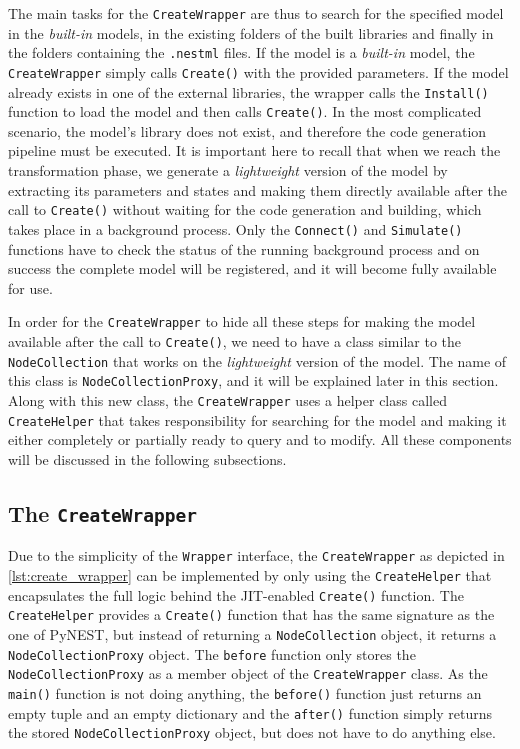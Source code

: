 The main tasks for the \texttt{CreateWrapper} are thus to search for the specified model in the \emph{built-in} models, in the existing folders of the built libraries and finally in the folders containing the \texttt{.nestml} files. If the model is a \emph{built-in} model, the \texttt{CreateWrapper} simply calls \texttt{Create()} with the provided parameters. If the model already exists in one of the external libraries, the wrapper calls the \texttt{Install()} function to load the model and then calls \texttt{Create()}. In the most complicated scenario, the model's library does not exist, and therefore the code generation pipeline must be executed. It is important here to recall that when we reach the transformation phase, we generate a \emph{lightweight} version of the model by extracting its parameters and states and making them directly available after the call to \texttt{Create()} without waiting for the code generation and building, which takes place in a background process. Only the \texttt{Connect()} and \texttt{Simulate()} functions have to check the status of the running background process and on success the complete model will be registered, and it will become fully available for use.

In order for the \texttt{CreateWrapper} to hide all these steps for making the model available after the call to \texttt{Create()}, we need to have a class similar to the \texttt{NodeCollection} that works on the \emph{lightweight} version of the model. The name of this class is \texttt{NodeCollectionProxy}, and it will be explained later in this section. Along with this new class, the \texttt{CreateWrapper} uses a helper class called \texttt{CreateHelper} that takes responsibility for searching for the model and making it either completely or partially ready to query and to modify. All these components will be discussed in the following subsections.

\subsection{The \texttt{CreateWrapper}}

Due to the simplicity of the \texttt{Wrapper} interface, the \texttt{CreateWrapper} as depicted in \autoref{lst:create_wrapper} can be implemented by only using the \texttt{CreateHelper} that encapsulates the full logic behind the JIT-enabled \texttt{Create()} function. The \texttt{CreateHelper} provides a \texttt{Create()} function that has the same signature as the one of PyNEST, but instead of returning a \texttt{NodeCollection} object, it returns a \texttt{NodeCollectionProxy} object. The \texttt{before} function only stores the \texttt{NodeCollectionProxy} as a member object of the \texttt{CreateWrapper} class. As the \texttt{main()} function is not doing anything, the \texttt{before()} function just returns an empty tuple and an empty dictionary and the \texttt{after()} function simply returns the stored \texttt{NodeCollectionProxy} object, but does not have to do anything else.

